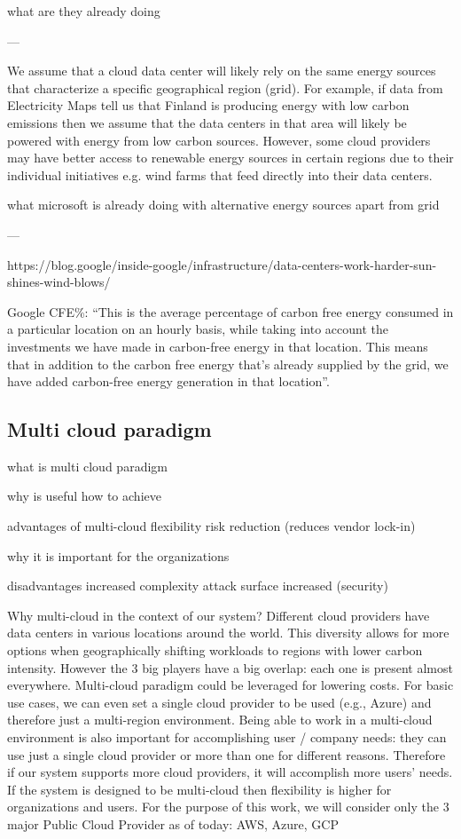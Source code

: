 what are they already doing

---

We assume that a cloud data center will likely rely on the same energy sources that characterize a specific geographical region (grid).
For example, if data from Electricity Maps tell us that Finland is producing energy with low carbon emissions then we assume that the data centers in that area will likely be powered with energy from low carbon sources.
However, some cloud providers may have better access to renewable energy sources in certain regions due to their individual initiatives e.g. wind farms that feed directly into their data centers.


what microsoft is already doing with alternative energy sources apart from grid


---

https://blog.google/inside-google/infrastructure/data-centers-work-harder-sun-shines-wind-blows/

Google CFE\%: “This is the average percentage of carbon free energy consumed in a particular location on an hourly basis, while taking into account the investments we have made in carbon-free energy in that location. This means that in addition to the carbon free energy that's already supplied by the grid, we have added carbon-free energy generation in that location”.

\subsection{Multi cloud paradigm}

what is multi cloud paradigm

why is useful
how to achieve

advantages of multi-cloud
flexibility
risk reduction (reduces vendor lock-in)

why it is important for the organizations


disadvantages
increased complexity
attack surface increased (security)




Why multi-cloud in the context of our system?
Different cloud providers have data centers in various locations around the world. This diversity allows for more options when geographically shifting workloads to regions with lower carbon intensity.
However the 3 big players have a big overlap: each one is present almost everywhere.
Multi-cloud paradigm could be leveraged for lowering costs.
For basic use cases, we can even set a single cloud provider to be used (e.g., Azure) and therefore just a multi-region environment.
Being able to work in a multi-cloud environment is also important for accomplishing user / company needs: they can use just a single cloud provider or more than one for different reasons. Therefore if our system supports more cloud providers, it will accomplish more users' needs.
If the system is designed to be multi-cloud then flexibility is higher for organizations and users.
For the purpose of this work, we will consider only the 3 major Public Cloud Provider as of today: AWS, Azure, GCP

